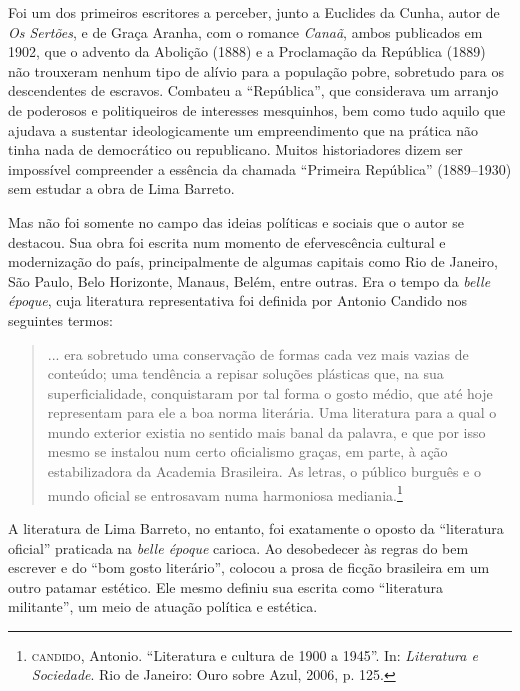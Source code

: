 \documentclass{extarticle}
\begin{document}
Foi um dos primeiros escritores a perceber, junto a Euclides da Cunha,
autor de \emph{Os Sertões}, e de Graça Aranha, com o romance
\emph{Canaã}, ambos publicados em 1902, que o advento da Abolição (1888)
e a Proclamação da República (1889) não trouxeram nenhum tipo de alívio
para a população pobre, sobretudo para os descendentes de escravos.
Combateu a ``República'', que considerava um arranjo de poderosos e
politiqueiros de interesses mesquinhos, bem como tudo aquilo que ajudava
a sustentar ideologicamente um empreendimento que na prática não tinha
nada de democrático ou republicano. Muitos historiadores dizem ser
impossível compreender a essência da chamada ``Primeira República''
(1889--1930) sem estudar a obra de Lima Barreto.

Mas não foi somente no campo das ideias políticas e sociais que o autor
se destacou. Sua obra foi escrita num momento de efervescência cultural
e modernização do país, principalmente de algumas capitais como Rio de
Janeiro, São Paulo, Belo Horizonte, Manaus, Belém, entre outras. Era o
tempo da \emph{belle époque}, cuja literatura representativa foi
definida por Antonio Candido nos seguintes termos:

\begin{quote}
... era sobretudo uma conservação de formas cada vez mais vazias de
conteúdo; uma tendência a repisar soluções plásticas que, na sua
superficialidade, conquistaram por tal forma o gosto médio, que até hoje
representam para ele a boa norma literária. Uma literatura para a qual o
mundo exterior existia no sentido mais banal da palavra, e que por isso
mesmo se instalou num certo oficialismo graças, em parte, à ação
estabilizadora da Academia Brasileira. As letras, o público burguês e o
mundo oficial se entrosavam numa harmoniosa mediania.\footnote{\textsc{candido},
  Antonio. ``Literatura e cultura de 1900 a 1945''. In: \emph{Literatura
  e Sociedade}. Rio de Janeiro: Ouro sobre Azul, 2006, p. 125.}
\end{quote}

A literatura de Lima Barreto, no entanto, foi exatamente o oposto da
``literatura oficial'' praticada na \emph{belle époque} carioca. Ao
desobedecer às regras do bem escrever e do ``bom gosto literário'',
colocou a prosa de ficção brasileira em um outro patamar estético. Ele
mesmo definiu sua escrita como ``literatura militante'', um meio de
atuação política e estética.
\end{document}
